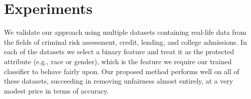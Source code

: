 
\section{Experiments}\label{sec:experiments}
We validate our approach using multiple datasets containing real-life data from the fields of criminal risk assessment, credit, lending, and college admissions. In each of the datasets we select a binary feature and treat it as the protected attribute (e.g., race or gender), which is the feature we require our trained classifier to behave fairly upon. Our proposed method performs well on all of these datasets, succeeding in removing unfairness almost entirely, at a very modest price in terms of accuracy.


\begin{table*}[h]
\centering
{}
\end{table*}
